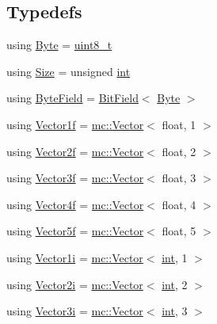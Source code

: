 \subsection*{Typedefs}
\begin{DoxyCompactItemize}
\item 
using \hyperlink{namespacemc_a64bc4fa1f43bc4da5c7ac98c04c863e8}{Byte} = \hyperlink{_s_d_l__config_8h_aba7bc1797add20fe3efdf37ced1182c5}{uint8\+\_\+t}
\item 
using \hyperlink{namespacemc_ad1c06461067735b3b17e0df612532c4e}{Size} = unsigned \hyperlink{_s_d_l__thread_8h_a6a64f9be4433e4de6e2f2f548cf3c08e}{int}
\item 
using \hyperlink{namespacemc_a4ed352b00f84d2c3e9843cf5ea375ca0}{Byte\+Field} = \hyperlink{structmc_1_1_bit_field}{Bit\+Field}$<$ \hyperlink{namespacemc_a64bc4fa1f43bc4da5c7ac98c04c863e8}{Byte} $>$
\item 
using \hyperlink{namespacemc_a189909477b1267500c9b30cf606df884}{Vector1f} = \hyperlink{classmc_1_1_vector}{mc\+::\+Vector}$<$ float, 1 $>$
\item 
using \hyperlink{namespacemc_a58c645c7ce4d8e1b71ae618f37f8a162}{Vector2f} = \hyperlink{classmc_1_1_vector}{mc\+::\+Vector}$<$ float, 2 $>$
\item 
using \hyperlink{namespacemc_ae4429bda568885c31776f449138faba0}{Vector3f} = \hyperlink{classmc_1_1_vector}{mc\+::\+Vector}$<$ float, 3 $>$
\item 
using \hyperlink{namespacemc_a4707e2534bbb331543497a85a755bc1c}{Vector4f} = \hyperlink{classmc_1_1_vector}{mc\+::\+Vector}$<$ float, 4 $>$
\item 
using \hyperlink{namespacemc_adf31bc87669908e0eb5e5c10506f4d85}{Vector5f} = \hyperlink{classmc_1_1_vector}{mc\+::\+Vector}$<$ float, 5 $>$
\item 
using \hyperlink{namespacemc_a6be7455b4341d989d713cfd9387b47ed}{Vector1i} = \hyperlink{classmc_1_1_vector}{mc\+::\+Vector}$<$ \hyperlink{_s_d_l__thread_8h_a6a64f9be4433e4de6e2f2f548cf3c08e}{int}, 1 $>$
\item 
using \hyperlink{namespacemc_a9d370d4e850e128d4c7ca446fd785a0d}{Vector2i} = \hyperlink{classmc_1_1_vector}{mc\+::\+Vector}$<$ \hyperlink{_s_d_l__thread_8h_a6a64f9be4433e4de6e2f2f548cf3c08e}{int}, 2 $>$
\item 
using \hyperlink{namespacemc_a4d62b05faba771617b95b5b75b6f15c3}{Vector3i} = \hyperlink{classmc_1_1_vector}{mc\+::\+Vector}$<$ \hyperlink{_s_d_l__thread_8h_a6a64f9be4433e4de6e2f2f548cf3c08e}{int}, 3 $>$
\item 

\end{DoxyCompactItemize}
